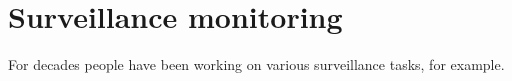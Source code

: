 \section{Surveillance monitoring}
\label{sec:intro-transportation}

For decades people have been working on various surveillance tasks, for example.